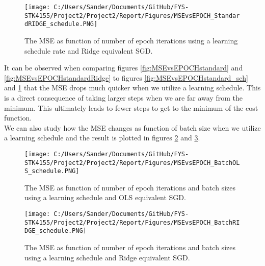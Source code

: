 \documentclass[12pt,a4paper]{article}
\begin{document}
\begin{figure}[H]
\centering
\texttt{[image: C:/Users/Sander/Documents/GitHub/FYS-STK4155/Project2/Project2/Report/Figures/MSEvsEPOCH\_StandardRIDGE\_schedule.PNG]}
\caption{\label{fig:MSEvsEPOCHstandardRidge_sch} The MSE as function of number of epoch iterations using a learning schedule rate and Ridge equivalent SGD.}
\end{figure}

\noindent It can be observed when comparing figures \ref{fig:MSEvsEPOCHstandard} and \ref{fig:MSEvsEPOCHstandardRidge} to figures \ref{fig:MSEvsEPOCHstandard_sch} and \ref{fig:MSEvsEPOCHstandardRidge_sch} that the MSE drops much quicker when we utilize a learning schedule. This is a direct consequence of taking larger steps when we are far away from the minimum. This ultimately leads to fewer steps to get to the minimum of the cost function. 
\\
We can also study how the MSE changes as function of batch size when we utilize a learning schedule and the result is plotted in figures \ref{fig:MSEvsEPOCHbatchOLS_sch} and \ref{fig:MSEvsEPOCHbatchRIDGE_sch}.

\begin{figure}[H]
\centering
\texttt{[image: C:/Users/Sander/Documents/GitHub/FYS-STK4155/Project2/Project2/Report/Figures/MSEvsEPOCH\_BatchOLS\_schedule.PNG]}
\caption{\label{fig:MSEvsEPOCHbatchOLS_sch} The MSE as function of number of epoch iterations and batch sizes using a learning schedule and OLS equivalent SGD.}
\end{figure}

\begin{figure}[H]
\centering
\texttt{[image: C:/Users/Sander/Documents/GitHub/FYS-STK4155/Project2/Project2/Report/Figures/MSEvsEPOCH\_BatchRIDGE\_schedule.PNG]}
\caption{\label{fig:MSEvsEPOCHbatchRIDGE_sch} The MSE as function of number of epoch iterations and batch sizes using a learning schedule and Ridge equivalent SGD.}
\end{figure}
\end{document}
